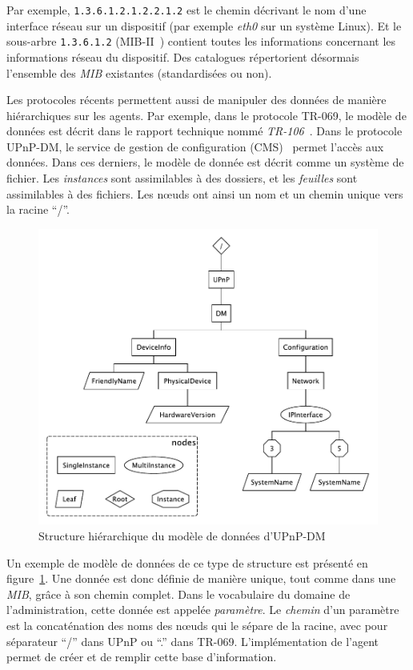 Par exemple, \verb|1.3.6.1.2.1.2.2.1.2| est le chemin décrivant le nom d'une interface réseau sur un dispositif (par exemple \textit{eth0} sur un système Linux). Et le sous-arbre \verb|1.3.6.1.2| (MIB-II~\cite{IETF:MIB-II}) contient toutes les informations concernant les informations réseau du dispositif. Des catalogues répertorient désormais l'ensemble des \textit{MIB} existantes (standardisées ou non).

Les protocoles récents permettent aussi de manipuler des données de manière hiérarchiques sur les agents. Par exemple, dans le protocole TR-069, le modèle de données est décrit dans le rapport technique nommé \textit{TR-106}~\cite{BBF:tr106}. Dans le protocole UPnP-DM, le service de gestion de configuration (CMS)~\cite{UPnP:DMCMS} permet l'accès aux données. Dans ces derniers, le modèle de donnée est décrit comme un système de fichier. Les \textit{instances} sont assimilables à des dossiers, et les \textit{feuilles} sont assimilables à des fichiers. Les nœuds ont ainsi un nom et un chemin unique vers la racine \enquote{/}. 
\begin{figure}[ht]
    \centering
    \includegraphics[width=.6\textwidth]{fig/rw-supervision-dmtree}
    \caption{Structure hiérarchique du modèle de données d'UPnP-DM}\label{fig:rw:supervision:dmtree}
\end{figure}

Un exemple de modèle de données de ce type de structure est présenté en figure~\ref{fig:rw:supervision:dmtree}. Une donnée est donc définie de manière unique, tout comme dans une \textit{MIB}, grâce à son chemin complet. Dans le vocabulaire du domaine de l'administration, cette donnée est appelée \textit{paramètre}. Le \textit{chemin} d'un paramètre est la concaténation des noms des nœuds qui le sépare de la racine, avec pour séparateur \enquote{/} dans UPnP ou \enquote{.} dans TR-069. L'implémentation de l'agent permet de créer et de remplir cette base d'information.

